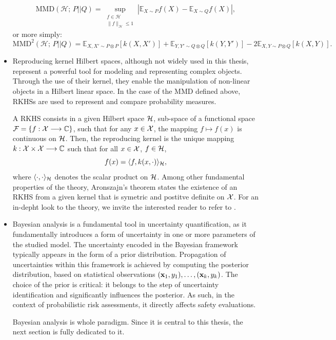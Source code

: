 \begin{itemize}
        \begin{equation}
            \text{MMD}(\mathcal{H};\, P||Q) = \sup_{\substack{f \in \mathcal{H}\\ \|f\|_{\mathcal{H}} \leq 1}} |\mathbb{E}_{X \sim P}f(X) - \mathbb{E}_{X \sim Q}f(X)|,
        \end{equation}
      or more simply:
      \begin{equation}
        \text{MMD}^2(\mathcal{H};\, P||Q) = \mathbb{E}_{X, X' \sim P \otimes P}[k(X, X')] + \mathbb{E}_{Y, Y' \sim Q \otimes Q}[k(Y, Y')] - 2 \mathbb{E}_{X,Y \sim P\otimes Q}[k(X, Y)].
      \end{equation}

    \item Reproducing kernel Hilbert spaces, although not widely used in this thesis, represent a powerful tool for modeling and representing complex objects. Through the use of their 
    kernel, they enable the manipulation of non-linear objects in a Hilbert linear space. In the case of the
    MMD defined above, RKHSs are used to represent and compare probability measures.

    A RKHS consists in a given Hilbert space $\mathcal{H}$, sub-space of a functional space $\mathcal{F}=\{f:\mathcal{X}\longrightarrow\mathbb{C}\}$, such that for any $x\in\mathcal{X}$, the mapping $f\mapsto f(x)$ is continuous on $\mathcal{H}$. Then, the reproducing kernel is the unique mapping $k:\mathcal{X}\times\mathcal{X}\longrightarrow\mathbb{C}$ such that for all $x\in\mathcal{X}$, $f\in\mathcal{H}$,
      \begin{equation}
        f(x) = \langle f,k(x,\cdot) \rangle_{\mathcal{H}},
      \end{equation}
    where $\langle\cdot,\cdot\rangle_{\mathcal{H}}$ denotes the scalar product on $\mathcal{H}$. Among other fundamental properties of the theory, Aronszajn's theorem \citep{aronszajn_theory_1950} states the existence of an RKHS from a given kernel that is symetric and postitve definite on $\mathcal{X}$. For an in-depht look to the theory, we invite the interested reader to refer to \cite{scholkopf_learning_2001}.

    \item  Bayesian analysis is a fundamental tool in uncertainty quantification, 
    as it fundamentally introduces a form of uncertainty
    in one or more parameters of the studied model. The uncertainty encoded in the Bayesian framework typically appears in the form of a prior distribution. Propagation of uncertainties within this framework is achieved by computing the posterior distribution, based on statistical observations $(\mathbf{x}_1, y_1), \ldots, (\mathbf{x}_k, y_k)$.
      The choice of the prior is critical: it belongs to the step of uncertainty identification and significantly influences the posterior. As such, in the context of probabilistic risk assessments, it directly affects safety evaluations.

      Bayesian analysis is whole paradigm. Since it is central to this thesis, the next section is fully dedicated to it.
\end{itemize}









